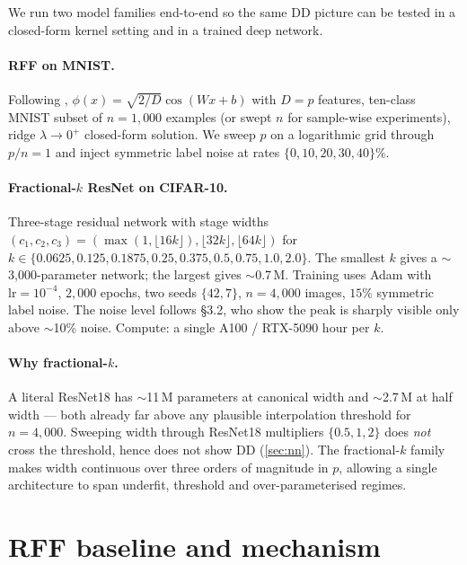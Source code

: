 \documentclass{article}
\begin{document}
We run two model families end-to-end so the same DD picture can be tested in a closed-form kernel setting and in a trained deep network.

\paragraph{RFF on MNIST.} Following \citet{rahimi2007random}, $\phi(x)=\sqrt{2/D}\cos(Wx+b)$ with $D=p$ features, ten-class MNIST subset of $n=1{,}000$ examples (or swept $n$ for sample-wise experiments), ridge $\lambda\to0^+$ closed-form solution. We sweep $p$ on a logarithmic grid through $p/n=1$ and inject symmetric label noise at rates $\{0,10,20,30,40\}\%$.

\paragraph{Fractional-$k$ ResNet on CIFAR-10.} Three-stage residual network with stage widths $(c_1,c_2,c_3)=(\max(1,\lfloor 16k\rfloor), \lfloor 32k\rfloor, \lfloor 64k\rfloor)$ for $k\in\{0.0625, 0.125, 0.1875, 0.25, 0.375, 0.5, 0.75, 1.0, 2.0\}$. The smallest $k$ gives a $\sim$3{,}000-parameter network; the largest gives $\sim$0.7\,M. Training uses Adam \citep{kingma2015adam} with $\mathrm{lr}=10^{-4}$, $2{,}000$ epochs, two seeds $\{42, 7\}$, $n=4{,}000$ images, $15\%$ symmetric label noise. The noise level follows \citet{belkin2019reconciling} \S3.2, who show the peak is sharply visible only above $\sim$10\% noise. Compute: a single A100 / RTX-5090 hour per $k$.

\paragraph{Why fractional-$k$.} A literal ResNet18 has $\sim$11\,M parameters at canonical width and $\sim$2.7\,M at half width --- both already far above any plausible interpolation threshold for $n=4{,}000$. Sweeping width through ResNet18 multipliers $\{0.5, 1, 2\}$ does \emph{not} cross the threshold, hence does not show DD (\cref{sec:nn}). The fractional-$k$ family makes width continuous over three orders of magnitude in $p$, allowing a single architecture to span underfit, threshold and over-parameterised regimes.

\section{RFF baseline and mechanism}
\label{sec:rff}
\end{document}
